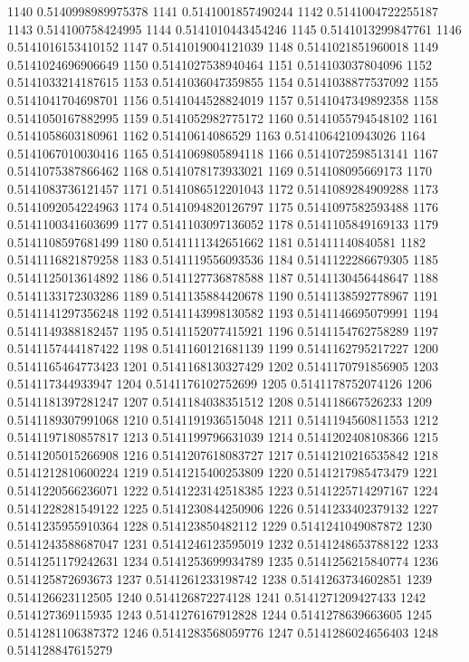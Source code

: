 1140 0.5140998989975378
1141 0.5141001857490244
1142 0.5141004722255187
1143 0.514100758424995
1144 0.5141010443454246
1145 0.5141013299847761
1146 0.5141016153410152
1147 0.5141019004121039
1148 0.5141021851960018
1149 0.5141024696906649
1150 0.5141027538940464
1151 0.514103037804096
1152 0.5141033214187615
1153 0.5141036047359855
1154 0.5141038877537092
1155 0.5141041704698701
1156 0.5141044528824019
1157 0.5141047349892358
1158 0.5141050167882995
1159 0.5141052982775172
1160 0.5141055794548102
1161 0.5141058603180961
1162 0.51410614086529
1163 0.5141064210943026
1164 0.5141067010030416
1165 0.5141069805894118
1166 0.5141072598513141
1167 0.5141075387866462
1168 0.5141078173933021
1169 0.514108095669173
1170 0.5141083736121457
1171 0.5141086512201043
1172 0.5141089284909288
1173 0.5141092054224963
1174 0.5141094820126797
1175 0.5141097582593488
1176 0.5141100341603699
1177 0.5141103097136052
1178 0.5141105849169133
1179 0.5141108597681499
1180 0.5141111342651662
1181 0.51411140840581
1182 0.5141116821879258
1183 0.5141119556093536
1184 0.5141122286679305
1185 0.5141125013614892
1186 0.5141127736878588
1187 0.5141130456448647
1188 0.5141133172303286
1189 0.5141135884420678
1190 0.5141138592778967
1191 0.5141141297356248
1192 0.5141143998130582
1193 0.5141146695079991
1194 0.5141149388182457
1195 0.5141152077415921
1196 0.5141154762758289
1197 0.5141157444187422
1198 0.5141160121681139
1199 0.5141162795217227
1200 0.5141165464773423
1201 0.5141168130327429
1202 0.5141170791856905
1203 0.514117344933947
1204 0.5141176102752699
1205 0.5141178752074126
1206 0.5141181397281247
1207 0.5141184038351512
1208 0.514118667526233
1209 0.5141189307991068
1210 0.5141191936515048
1211 0.5141194560811553
1212 0.5141197180857817
1213 0.5141199796631039
1214 0.5141202408108366
1215 0.5141205015266908
1216 0.5141207618083727
1217 0.5141210216535842
1218 0.5141212810600224
1219 0.5141215400253809
1220 0.5141217985473479
1221 0.5141220566236071
1222 0.5141223142518385
1223 0.5141225714297167
1224 0.5141228281549122
1225 0.5141230844250906
1226 0.5141233402379132
1227 0.5141235955910364
1228 0.514123850482112
1229 0.5141241049087872
1230 0.5141243588687047
1231 0.5141246123595019
1232 0.5141248653788122
1233 0.5141251179242631
1234 0.5141253699934789
1235 0.5141256215840774
1236 0.514125872693673
1237 0.5141261233198742
1238 0.5141263734602851
1239 0.514126623112505
1240 0.514126872274128
1241 0.5141271209427433
1242 0.514127369115935
1243 0.5141276167912828
1244 0.5141278639663605
1245 0.5141281106387372
1246 0.5141283568059776
1247 0.5141286024656403
1248 0.514128847615279
